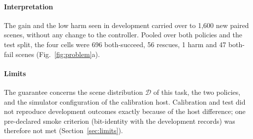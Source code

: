 \paragraph{Interpretation} The gain and the low harm seen in development carried over to 1,600 new paired scenes, without any change to the controller. Pooled over both policies and the test split, the four cells were 696 both-succeed, 56 rescues, 1 harm and 47 both-fail scenes (Fig.~\ref{fig:problem}a).

\paragraph{Limits} The guarantee concerns the scene distribution $\mathcal{D}$ of this task, the two policies, and the simulator configuration of the calibration host. Calibration and test did not reproduce development outcomes exactly because of the host difference; one pre-declared smoke criterion (bit-identity with the development records) was therefore not met (Section~\ref{sec:limits}).

